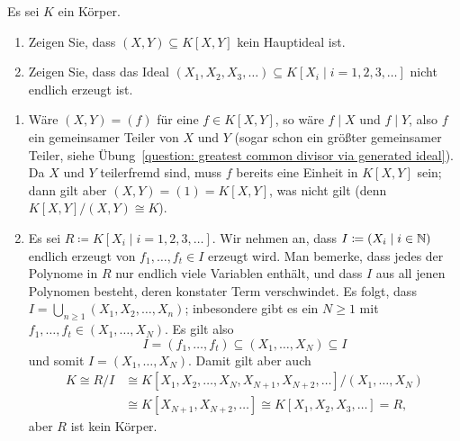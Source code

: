 \begin{question}[subtitle = Gegenbeispiele]
  \label{question: examples for non principal and not finitely generated modules}
  Es sei $K$ ein Körper.
  \begin{enumerate}
    \item
      Zeigen Sie, dass $(X,Y) \subseteq K[X,Y]$ kein Hauptideal ist.
    \item
      Zeigen Sie, dass das Ideal $(X_1, X_2, X_3, \dotsc) \subseteq K[X_i \mid i = 1, 2, 3, \dotsc]$ nicht endlich erzeugt ist.
  \end{enumerate}
\end{question}


\begin{solution}
  \begin{enumerate}
    \item
      Wäre $(X,Y) = (f)$ für eine $f \in K[X,Y]$, so wäre $f \mid X$ und $f \mid Y$, also $f$ ein gemeinsamer Teiler von $X$ und $Y$ (sogar schon ein größter gemeinsamer Teiler, siehe Übung~\ref{question: greatest common divisor via generated ideal}).
      Da $X$ und $Y$ teilerfremd sind, muss $f$ bereits eine Einheit in $K[X,Y]$ sein;
      dann gilt aber $(X,Y) = (1) = K[X,Y]$, was nicht gilt (denn $K[X,Y]/(X,Y) \cong K$).
    \item
      Es sei $R \coloneqq K[X_i \mid i = 1, 2, 3, \dotsc]$.
      Wir nehmen an, dass $I \coloneqq (X_i \mid i \in \mathbb{N})$ endlich erzeugt von $f_1, \dotsc, f_t \in I$ erzeugt wird.
      Man bemerke, dass jedes der Polynome in $R$ nur endlich viele Variablen enthält, und dass $I$ aus all jenen Polynomen besteht, deren konstater Term verschwindet.
      Es folgt, dass $I = \bigcup_{n \geq 1} (X_1, X_2, \dotsc, X_n)$;
      inbesondere gibt es ein $N \geq 1$ mit $f_1, \dotsc, f_t \in (X_1, \dotsc, X_N)$.
      Es gilt also
      \[
        I = (f_1, \dotsc, f_t) \subseteq (X_1, \dotsc, X_N) \subseteq I
      \]
      und somit $I = (X_1, \dotsc, X_N)$.
      Damit gilt aber auch
      \begin{align*}
                K
         \cong  R/I
        &\cong  K[X_1, X_2, \dotsc, X_N, X_{N+1}, X_{N+2}, \dotsc]/(X_1, \dotsc, X_N)
        \\
        &\cong  K[X_{N+1}, X_{N+2}, \dotsc]
         \cong  K[X_1, X_2, X_3, \dotsc]
         =      R,
      \end{align*}
      aber $R$ ist kein Körper.
  \end{enumerate}
\end{solution}


